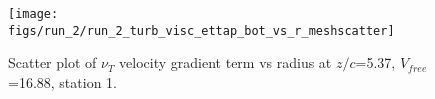\begin{figure}[H]
\centering
\texttt{[image: figs/run\_2/run\_2\_turb\_visc\_ettap\_bot\_vs\_r\_meshscatter]}
\caption{Scatter plot of $\nu_T$ velocity gradient term vs radius at $z/c$=5.37, $V_{free}$=16.88, station 1.}
\label{fig:run_2_turb_visc_ettap_bot_vs_r_meshscatter}
\end{figure}


